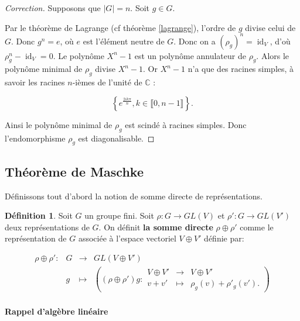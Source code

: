 \documentclass[french]{article}
\theoremstyle{theorem}
\theoremstyle{definition}
\newtheorem{protodefinition}{Définition}[section]
\newenvironment{definition}
    {\colorlet{shadecolor}{green!5}\begin{shaded}\begin{protodefinition}}
    {\end{protodefinition}\end{shaded}}
\theoremstyle{remark}
\newcommand{\C}{\mathbb{C}}
\begin{document}
\begin{proof}[Correction]
  Supposons que \(\lvert G \rvert = n\). Soit \(g \in G\).

  Par le théorème de Lagrange (cf théorème \ref{lagrange}), l'ordre de \(g\) divise celui de \(G\). Donc \(g^{n} = e\), où \(e\) est l'élément neutre de \(G\). Donc on a \((\rho_g)^{n} = \operatorname{id}_V\), d'où \(\rho_g^{n}-\operatorname{id}_V = 0\). Le polynôme \(X^{n}-1 \) est un polynôme annulateur de \(\rho_g\). Alors le polynôme minimal de \(\rho_g\) divise \(X^{n}-1\). Or \(X ^{n}-1\) n'a que des racines simples, à savoir les racines \(n\)-ièmes de l'unité de \(\C\) :

  \[\left\{ e^{\frac{2 i k \pi}{n}}, k \in \llbracket 0, n-1 \rrbracket \right\}.\]  %

  Ainsi le polynôme minimal de \(\rho_g\) est scindé à racines simples. Donc l'endomorphisme \(\rho_g\) est diagonalisable.
\end{proof}

\subsection{Théorème de Maschke}

Définissons tout d'abord la notion de somme directe de représentations.

\begin{definition}
  Soit \(G\) un groupe fini. Soit \(\rho : G \to GL(V)\) et \(\rho' : G \to GL(V')\) deux représentations de \(G\). On définit \textbf{la somme directe} \(\rho\oplus \rho'\) comme le représentation de \(G\) associée à l'espace vectoriel \(V \oplus V'\) définie par:

  \begin{equation}
    \begin{matrix}
    \rho \oplus \rho' : & G & \longrightarrow & GL(V\oplus V') \\
    \ & g & \longmapsto & \left((\rho \oplus \rho')g : \begin{matrix}
      V \oplus V' & \longrightarrow & V \oplus V' \\
      v + v' & \longmapsto & \rho_g(v) + \rho'_g(v').
    \end{matrix}\right)
    \end{matrix}
  \end{equation}
\end{definition}

\paragraph{Rappel d'algèbre linéaire}
\end{document}
